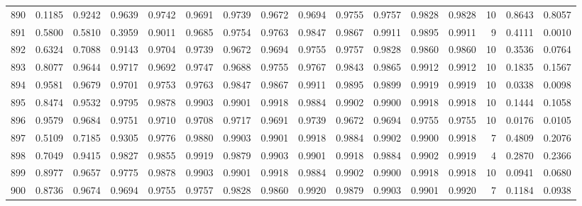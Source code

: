 \begin{tabular}{lrrrrrrrrrrrrrrr}
890 &      0.1185 &  0.9242 &  0.9639 &  0.9742 &  0.9691 &  0.9739 &  0.9672 &  0.9694 &  0.9755 &  0.9757 &   0.9828 &     0.9828 &     10 &                    0.8643 &                     0.8057 \\
891 &      0.5800 &  0.5810 &  0.3959 &  0.9011 &  0.9685 &  0.9754 &  0.9763 &  0.9847 &  0.9867 &  0.9911 &   0.9895 &     0.9911 &      9 &                    0.4111 &                     0.0010 \\
892 &      0.6324 &  0.7088 &  0.9143 &  0.9704 &  0.9739 &  0.9672 &  0.9694 &  0.9755 &  0.9757 &  0.9828 &   0.9860 &     0.9860 &     10 &                    0.3536 &                     0.0764 \\
893 &      0.8077 &  0.9644 &  0.9717 &  0.9692 &  0.9747 &  0.9688 &  0.9755 &  0.9767 &  0.9843 &  0.9865 &   0.9912 &     0.9912 &     10 &                    0.1835 &                     0.1567 \\
894 &      0.9581 &  0.9679 &  0.9701 &  0.9753 &  0.9763 &  0.9847 &  0.9867 &  0.9911 &  0.9895 &  0.9899 &   0.9919 &     0.9919 &     10 &                    0.0338 &                     0.0098 \\
895 &      0.8474 &  0.9532 &  0.9795 &  0.9878 &  0.9903 &  0.9901 &  0.9918 &  0.9884 &  0.9902 &  0.9900 &   0.9918 &     0.9918 &     10 &                    0.1444 &                     0.1058 \\
896 &      0.9579 &  0.9684 &  0.9751 &  0.9710 &  0.9708 &  0.9717 &  0.9691 &  0.9739 &  0.9672 &  0.9694 &   0.9755 &     0.9755 &     10 &                    0.0176 &                     0.0105 \\
897 &      0.5109 &  0.7185 &  0.9305 &  0.9776 &  0.9880 &  0.9903 &  0.9901 &  0.9918 &  0.9884 &  0.9902 &   0.9900 &     0.9918 &      7 &                    0.4809 &                     0.2076 \\
898 &      0.7049 &  0.9415 &  0.9827 &  0.9855 &  0.9919 &  0.9879 &  0.9903 &  0.9901 &  0.9918 &  0.9884 &   0.9902 &     0.9919 &      4 &                    0.2870 &                     0.2366 \\
899 &      0.8977 &  0.9657 &  0.9775 &  0.9878 &  0.9903 &  0.9901 &  0.9918 &  0.9884 &  0.9902 &  0.9900 &   0.9918 &     0.9918 &     10 &                    0.0941 &                     0.0680 \\
900 &      0.8736 &  0.9674 &  0.9694 &  0.9755 &  0.9757 &  0.9828 &  0.9860 &  0.9920 &  0.9879 &  0.9903 &   0.9901 &     0.9920 &      7 &                    0.1184 &                     0.0938 \\

\end{tabular}
